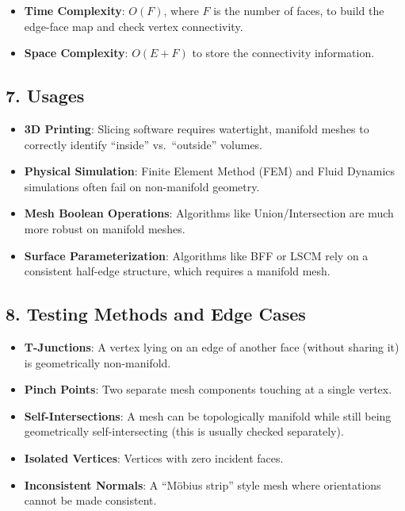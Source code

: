 \begin{itemize}
    \item \textbf{Time Complexity}: $O(F)$, where $F$ is the number of faces, to build the edge-face map and check vertex connectivity.
    \item \textbf{Space Complexity}: $O(E + F)$ to store the connectivity information.
\end{itemize}

\subsection{7. Usages}

\begin{itemize}
    \item \textbf{3D Printing}: Slicing software requires watertight, manifold meshes to correctly identify ``inside'' vs.\ ``outside'' volumes.
    \item \textbf{Physical Simulation}: Finite Element Method (FEM) and Fluid Dynamics simulations often fail on non-manifold geometry.
    \item \textbf{Mesh Boolean Operations}: Algorithms like Union/Intersection are much more robust on manifold meshes.
    \item \textbf{Surface Parameterization}: Algorithms like BFF or LSCM rely on a consistent half-edge structure, which requires a manifold mesh.
\end{itemize}

\subsection{8. Testing Methods and Edge Cases}

\begin{itemize}
    \item \textbf{T-Junctions}: A vertex lying on an edge of another face (without sharing it) is geometrically non-manifold.
    \item \textbf{Pinch Points}: Two separate mesh components touching at a single vertex.
    \item \textbf{Self-Intersections}: A mesh can be topologically manifold while still being geometrically self-intersecting (this is usually checked separately).
    \item \textbf{Isolated Vertices}: Vertices with zero incident faces.
    \item \textbf{Inconsistent Normals}: A ``M\"obius strip'' style mesh where orientations cannot be made consistent.
\end{itemize}

